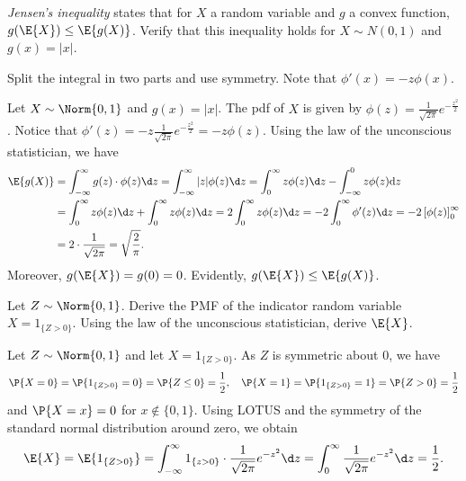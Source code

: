 	\begin{exercise}
		\emph{Jensen's inequality} states that for $X$ a random variable and $g$ a convex function, $g(\E{X}) \leq \E{g(X)}$. Verify that this inequality holds for $X \sim N(0,1)$ and $g(x) = |x|$.
		\begin{hint}
			Split the integral in two parts and use symmetry. Note that $\phi'(x) = -z \phi(x)$.
		\end{hint}
		\begin{solution}
			Let $X \sim \Norm{0,1}$ and $g(x) = |x|$. The pdf of $X$ is given by $\phi(z) = \frac{1}{\sqrt{2 \pi}} e^{- \frac{z^2}{2}}$. Notice that $\phi'(z) = - z \frac{1}{\sqrt{2 \pi}} e^{- \frac{z^2}{2}} = -z \phi(z)$. Using the law of the unconscious statistician, we have
			\begin{align*}
				\E{g(X)} & = \int_{-\infty}^{\infty} g(z) \cdot \phi(z) \d z = \int_{-\infty}^{\infty} |z| \phi(z) \d z = \int_0^{\infty} z \phi(z) \d z - \int_{-\infty}^0 z \phi(z) \mathrm{d}z \\
				& = \int_0^{\infty} z \phi(z) \d z + \int_0^{\infty} z \phi(z) \d z = 2 \int_0^{\infty} z \phi(z) \d z = - 2 \int_0^{\infty} \phi'(z) \d z = - 2 \left[\phi(z)\right]_0^{\infty} \\
				& = 2 \cdot \frac{1}{\sqrt{2 \pi}} = \sqrt{\frac{2}{\pi}}.	
			\end{align*}
			Moreover, $g(\E{X}) = g(0) = 0$. Evidently, $g(\E{X}) \leq \E{g(X)}$.
		\end{solution}
	\end{exercise}

	\begin{exercise}
	Let $Z \sim \Norm{0,1}$. Derive the PMF of the indicator random variable $X=1_{\{Z>0\}}$. Using the law of the unconscious statistician, derive $\E{X}$.
		\begin{solution}
			Let $Z \sim \Norm{0,1}$ and let $X = 1_{\{Z>0\}}$. As $Z$ is symmetric about $0$, we have
			\begin{align*}
				\P{X = 0} = \P{1_{\{Z>0\}} = 0} = \P{Z \leq 0} = \frac{1}{2}, \quad \P{X = 1} = \P{1_{\{Z>0\}} = 1} = \P{Z > 0} = \frac{1}{2}
			\end{align*}
			and $\P{X = x} = 0$ for $x \notin \{0,1\}$. Using LOTUS and the symmetry of the standard normal distribution around zero, we obtain
			\begin{align*}
				\E{X} = \E{1_{\{Z>0\}}} = \int_{-\infty}^{\infty} 1_{\{z > 0\}} \cdot \frac{1}{\sqrt{2 \pi}} e^{-z^2} \d z = \int_0^{\infty} \frac{1}{\sqrt{2 \pi}} e^{-z^2} \d z = \frac{1}{2}.
			\end{align*}
		\end{solution}
	\end{exercise}

